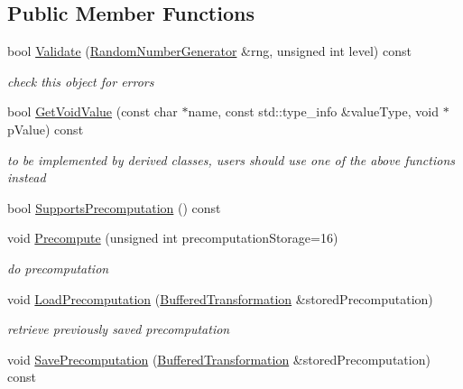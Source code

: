 \subsection*{Public Member Functions}
\begin{DoxyCompactItemize}
\item 
bool \hyperlink{class_d_l___group_parameters_aa2b615bc7ed3561914a27a8c456258aa}{Validate} (\hyperlink{class_random_number_generator}{RandomNumberGenerator} \&rng, unsigned int level) const 
\begin{DoxyCompactList}\small\item\em check this object for errors \item\end{DoxyCompactList}\item 
\hypertarget{class_d_l___group_parameters_ae782187e2221e3dc0a00d49116ec7df5}{
bool \hyperlink{class_d_l___group_parameters_ae782187e2221e3dc0a00d49116ec7df5}{GetVoidValue} (const char $\ast$name, const std::type\_\-info \&valueType, void $\ast$pValue) const }
\label{class_d_l___group_parameters_ae782187e2221e3dc0a00d49116ec7df5}

\begin{DoxyCompactList}\small\item\em to be implemented by derived classes, users should use one of the above functions instead \item\end{DoxyCompactList}\item 
bool \hyperlink{class_d_l___group_parameters_a42a423fd9d31e77a1d36e7da66da12bb}{SupportsPrecomputation} () const 
\item 
void \hyperlink{class_d_l___group_parameters_a5f04ae8b4d0b9410a046af1607fbbb6f}{Precompute} (unsigned int precomputationStorage=16)
\begin{DoxyCompactList}\small\item\em do precomputation \item\end{DoxyCompactList}\item 
\hypertarget{class_d_l___group_parameters_a9b8c93a87802ef09dc546a994c850697}{
void \hyperlink{class_d_l___group_parameters_a9b8c93a87802ef09dc546a994c850697}{LoadPrecomputation} (\hyperlink{class_buffered_transformation}{BufferedTransformation} \&storedPrecomputation)}
\label{class_d_l___group_parameters_a9b8c93a87802ef09dc546a994c850697}

\begin{DoxyCompactList}\small\item\em retrieve previously saved precomputation \item\end{DoxyCompactList}\item 
\hypertarget{class_d_l___group_parameters_a443eb0933235d77d09da6bc7da24c74c}{
void \hyperlink{class_d_l___group_parameters_a443eb0933235d77d09da6bc7da24c74c}{SavePrecomputation} (\hyperlink{class_buffered_transformation}{BufferedTransformation} \&storedPrecomputation) const }
\label{class_d_l___group_parameters_a443eb0933235d77d09da6bc7da24c74c}


\end{DoxyCompactItemize}

